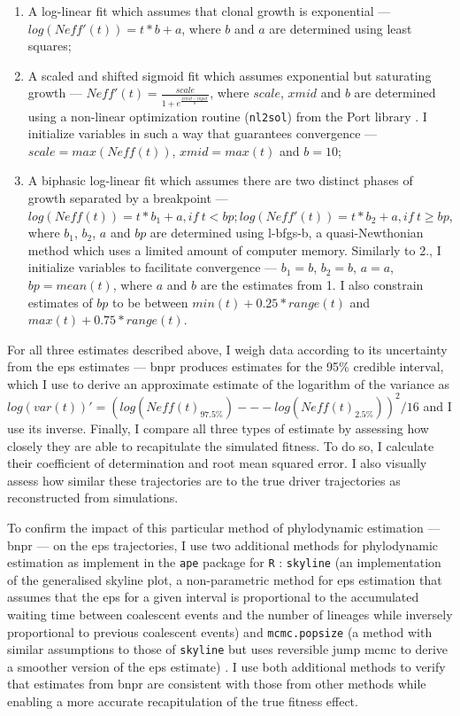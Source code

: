 \begin{enumerate}
    \item A log-linear fit which assumes that clonal growth is exponential --- $log(Neff'(t)) = t * b + a$, where $b$ and $a$ are determined using least squares;
    \item A scaled and shifted sigmoid fit which assumes exponential but saturating growth --- $Neff'(t) = \frac{scale}{1+e^{\frac{xmid-input}{b}}}$, where $scale$, $xmid$ and $b$ are determined using a non-linear optimization routine (\texttt{nl2sol}) from the Port library \cite{noauthor_undated-gs}. I initialize variables in such a way that guarantees convergence --- $scale=max(Neff(t))$, $xmid=max(t)$ and $b=10$;
    \item A biphasic log-linear fit which assumes there are two distinct phases of growth separated by a breakpoint --- $log(Neff(t)) = t * b_1 + a, if\ t < bp; log(Neff'(t)) = t * b_2 + a, if\ t \geq bp$, where $b_1$, $b_2$, $a$ and $bp$ are determined using \ac{l-bfgs-b}, a quasi-Newthonian method which uses a limited amount of computer memory. Similarly to 2., I initialize variables to facilitate convergence --- $b_1=b$, $b_2=b$, $a=a$, $bp=mean(t)$, where $a$ and $b$ are the estimates from 1. I also constrain estimates of $bp$ to be between $min(t) + 0.25*range(t)$ and $max(t) + 0.75 * range(t)$.
\end{enumerate}

For all three estimates described above, I weigh data according to its uncertainty from the \ac{eps} estimates --- \ac{bnpr} produces estimates for the 95\% credible interval, which I use to derive an approximate estimate of the logarithm of the variance as $log(var(t))' = (log(Neff(t)_{97.5\%}) --- log(Neff(t)_{2.5\%}))^2/16$ and I use its inverse. Finally, I compare all three types of estimate by assessing how closely they are able to recapitulate the simulated fitness. To do so, I calculate their coefficient of determination and root mean squared error. I also visually assess how similar these trajectories are to the true driver trajectories as reconstructed from simulations.

To confirm the impact of this particular method of phylodynamic estimation --- \ac{bnpr} --- on the \ac{eps} trajectories, I use two additional methods for phylodynamic estimation as implement in the \texttt{ape} package for \texttt{R} \cite{Paradis2019-na}: \texttt{skyline} (an implementation of the generalised skyline plot, a non-parametric method for \ac{eps} estimation that assumes that the \ac{eps} for a given interval is proportional to the accumulated waiting time between coalescent events and the number of lineages while inversely proportional to previous coalescent events) and \texttt{mcmc.popsize} (a method with similar assumptions to those of \texttt{skyline} but uses reversible jump \ac{mcmc} to derive a smoother version of the \ac{eps} estimate) \cite{Opgen-Rhein2005-pi}. I use both additional methods to verify that estimates from \ac{bnpr} are consistent with those from other methods while enabling a more accurate recapitulation of the true fitness effect.

